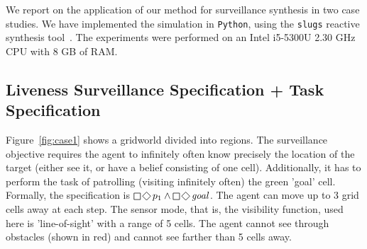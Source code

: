 We report on the application of our method for surveillance synthesis in two case studies. We have implemented the simulation in \texttt{Python}, using the \texttt{slugs} reactive synthesis tool~\cite{EhlersR16}. The experiments were performed on an Intel i5-5300U 2.30 GHz CPU with 8 GB of RAM. 

\subsection{Liveness Surveillance Specification + Task Specification}
Figure~\ref{fig:case1} shows a gridworld divided into  regions. The surveillance objective requires the agent to infinitely often know precisely the location of the target (either see it, or have a belief consisting of one cell). Additionally, it has to perform the task of patrolling (visiting infinitely often) the green 'goal' cell. Formally, the specification is $\LTLglobally\LTLfinally p_1 \wedge \LTLglobally\LTLfinally \mathit{goal}$. The agent can move up to 3 grid cells away at each step. The sensor mode, that is, the visibility function, used here is 'line-of-sight' with a range of 5 cells. The agent cannot see through obstacles (shown in red) and cannot see farther than 5 cells away. 


